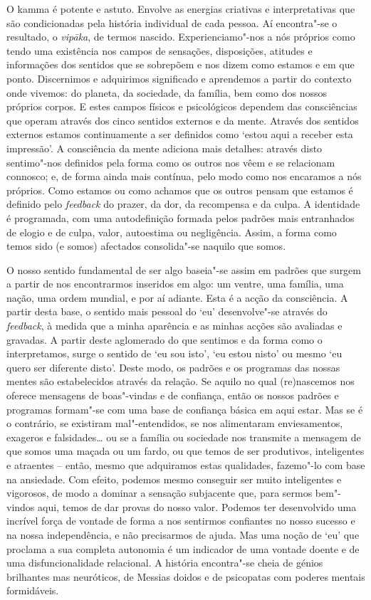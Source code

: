 O kamma é potente e astuto. Envolve as energias criativas e interpretativas que
são condicionadas pela história individual de cada pessoa. Aí encontra"-se o
resultado, o \emph{vipāka}, de termos nascido. Experienciamo"-nos a nós próprios
como tendo uma existência nos campos de sensações, disposições, atitudes e
informações dos sentidos que se sobrepõem e nos dizem como estamos e em que
ponto. Discernimos e adquirimos significado e aprendemos a partir do contexto
onde vivemos: do planeta, da sociedade, da família, bem como dos nossos próprios
corpos. E estes campos físicos e psicológicos dependem das consciências que
operam através dos cinco sentidos externos e da mente. Através dos sentidos
externos estamos continuamente a ser definidos como `estou aqui a receber esta
impressão'. A consciência da mente adiciona mais detalhes: através disto
sentimo"-nos definidos pela forma como os outros nos vêem e se relacionam
connosco; e, de forma ainda mais contínua, pelo modo como nos encaramos a nós
próprios. Como estamos ou como achamos que os outros pensam que estamos é
definido pelo \emph{feedback} do prazer, da dor, da recompensa e da culpa. A
identidade é programada, com uma autodefinição formada pelos padrões mais
entranhados de elogio e de culpa, valor, autoestima ou negligência. Assim, a
forma como temos sido (e somos) afectados consolida"-se naquilo que somos.

O nosso sentido fundamental de ser algo baseia"-se assim em padrões que surgem a
partir de nos encontrarmos inseridos em algo: um ventre, uma família, uma nação,
uma ordem mundial, e por aí adiante. Esta é a acção da consciência. A partir
desta base, o sentido mais pessoal do `eu' desenvolve"-se através do
\emph{feedback}, à medida que a minha aparência e as minhas acções são avaliadas
e gravadas. A partir deste aglomerado do que sentimos e da forma como o
interpretamos, surge o sentido de `eu sou isto', `eu estou nisto' ou mesmo `eu
quero ser diferente disto'. Deste modo, os padrões e os programas das nossas
mentes são estabelecidos através da relação. Se aquilo no qual (re)nascemos nos
oferece mensagens de boas"-vindas e de confiança, então os nossos padrões e
programas formam"-se com uma base de confiança básica em aqui estar. Mas se é o
contrário, se existiram mal"-entendidos, se nos alimentaram enviesamentos,
exageros e falsidades\ldots{} ou se a família ou sociedade nos transmite a
mensagem de que somos uma maçada ou um fardo, ou que temos de ser produtivos,
inteligentes e atraentes -- então, mesmo que adquiramos estas qualidades,
fazemo"-lo com base na ansiedade. Com efeito, podemos mesmo conseguir ser muito
inteligentes e vigorosos, de modo a dominar a sensação subjacente que, para
sermos bem"-vindos aqui, temos de dar provas do nosso valor. Podemos ter
desenvolvido uma incrível força de vontade de forma a nos sentirmos confiantes
no nosso sucesso e na nossa independência, e não precisarmos de ajuda. Mas uma
noção de `eu' que proclama a sua completa autonomia é um indicador de uma
vontade doente e de uma disfuncionalidade relacional. A história encontra"-se
cheia de génios brilhantes mas neuróticos, de Messias doidos e de psicopatas com
poderes mentais formidáveis.

